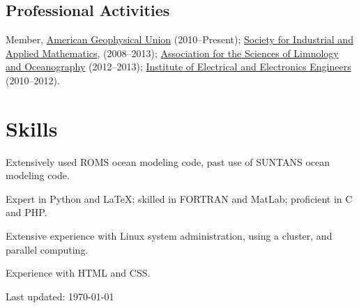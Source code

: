 \documentclass[10pt,letterpaper]{article}
\renewenvironment{itemize}{
  \begin{list}{}{
    \setlength{\leftmargin}{1.5em}
    \setlength{\itemsep}{0.25em}
    \setlength{\parskip}{0pt}
    \setlength{\parsep}{0.25em}
  }
}{
  \end{list}
}
\begin{document}
\subsection*{Professional Activities}

\begin{itemize}

\item Member, \href{http://www.agu.org/}{American Geophysical Union} (2010--Present); \href{http://www.siam.org/}{Society for Industrial and Applied Mathematics}, (2008--2013); \href{http://www.aslo.org/}{Association for the Sciences of Limnology and Oceanography} (2012--2013); \href{http://www.ieee.org/}{Institute of Electrical and Electronics Engineers} (2010--2012).

%

\end{itemize}

\section*{Skills}
\begin{itemize}
	\item Extensively used ROMS ocean modeling code, past use of SUNTANS ocean modeling code.
	\item Expert in Python and \LaTeX; skilled in FORTRAN and MatLab; proficient in C and PHP.
	\item Extensive experience with Linux system administration, using a cluster, and parallel computing.
	\item Experience with HTML and CSS.
\end{itemize}



\begin{center}
  \begin{small}
    Last updated: \today
  \end{small}
\end{center}
\end{document}

